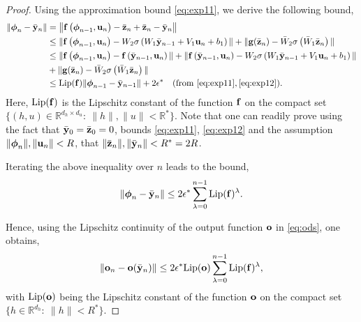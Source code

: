 \documentclass{article} \usepackage{iclr2022_conference,times}
\newcommand{\by}{{\bf y}}
\newcommand{\bz}{{\bf z}}
\newcommand{\bu}{{\bf u}}
\newcommand{\bh}{{\boldsymbol{\phi}}}
\newcommand{\bo}{{\bf o}}
\newcommand{\R}{{\mathbb R}}
\newcommand{\bif}{{\bf f}}
\newcommand{\bg}{{\bf g}}
\begin{document}
\begin{proof}
Using the approximation bound \eqref{eq:exp11}, we derive the following bound, 
\begin{align*}
    \|\bh_n - \bar{\by}_n\| &= \left\|\bif\left(\bh_{n-1},\bu_n\right)- \bar{\bz}_n + \bar{\bz}_n - \bar{\by}_n \right\| \\
    &\leq \|\bif\left(\bh_{n-1},\bu_n\right)- W_2\sigma\left(W_1 \bar{\by}_{n-1} + V_1 \bu_n + b_1 \right)\| + \|\bg(\bar{\bz}_n) - \bar{W}_2\sigma\left(\bar{W}_1 \bar{\bz}_n \right)\| \\
    &\leq \|\bif\left(\bh_{n-1},\bu_n\right) -\bif\left(\bar{\by}_{n-1},\bu_n\right)\| + \|\bif\left(\bar{\by}_{n-1},\bu_n\right) -  W_2\sigma\left(W_1 \bar{\by}_{n-1} + V_1 \bu_n + b_1 \right)\| \\
    &+ \|\bg(\bar{\bz}_n) - \bar{W}_2\sigma\left(\bar{W}_1 \bar{\bz}_n \right)\| \\ 
    &\leq {\rm Lip}(\bif) \|\bh_{n-1} - \bar{\by}_{n-1}\| + 2 \epsilon^{\ast} \quad ({\rm from}~ \eqref{eq:exp11},\eqref{eq:exp12}). 
\end{align*}
Here, ${\rm Lip}(\bif)$ is the Lipschitz constant of the function $\bif$ on the compact set $\{(h,u) \in \R^{d_h\times d_u}: ~\|h\|,\|u\| < \R^{\ast}\}$. Note that one can readily prove using the fact that $\bar{\by}_0 = \bar{\bz}_0 = 0$, bounds \eqref{eq:exp11}, \eqref{eq:exp12} and the assumption $\|\bh_n\|,\|\bu_n\| < R$, that $\|\bar{\bz}_n\|,\|\bar{\by}_n\| < R^{\ast} = 2R$. 


Iterating the above inequality over $n$ leads to the bound,
\begin{equation}
    \label{eq:exp15}
    \|\bh_n - \bar{\by}_n\|  \leq 2 \epsilon^{\ast} \sum_{\lambda=0}^{n-1}{\rm Lip}(\bif)^\lambda.
\end{equation}

Hence, using the Lipschitz continuity of the output function $\bo$ in \eqref{eq:ods}, one obtains,
\begin{equation}
    \label{eq:exp18}
     \|\bo_n - \bo(\bar{\by}_n)\|  \leq 2 \epsilon^{\ast} {\rm Lip}(\bo)\sum_{\lambda=0}^{n-1}{\rm Lip}(\bif)^\lambda,
\end{equation}
with ${\rm Lip}(\bo)$ being the Lipschitz constant of the function $\bo$ on the compact set $\{h \in \R^{d_h}: ~\|h\| < R^{\ast}\}$.


\end{proof}
\end{document}
